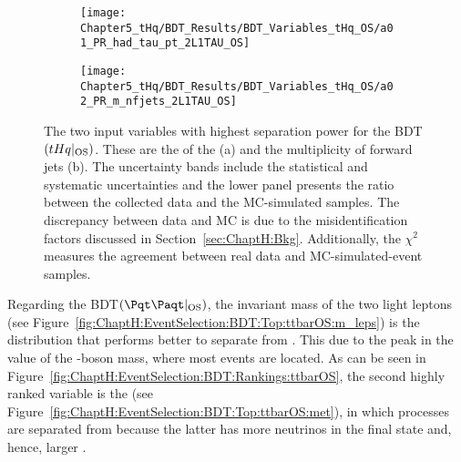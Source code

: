 \begin{figure}[h]
\centering
\begin{subfigure}{.475\textwidth}
  \centering
  \texttt{[image: Chapter5\_tHq/BDT\_Results/BDT\_Variables\_tHq\_OS/a01\_PR\_had\_tau\_pt\_2L1TAU\_OS]}
  \caption{}
  \label{fig:ChaptH:EventSelection:BDT:Top:tHqOS:pt}
\end{subfigure}%
\begin{subfigure}{.475\textwidth}
  \centering
  \texttt{[image: Chapter5\_tHq/BDT\_Results/BDT\_Variables\_tHq\_OS/a02\_PR\_m\_nfjets\_2L1TAU\_OS]}
  \caption{}
  \label{fig:ChaptH:EventSelection:BDT:Top:tHqOS:n_fjets}
\end{subfigure}
\caption{The two input variables with highest separation power for the BDT$(tHq|_{\text{OS}})$. 
These are the \pT of the \tauhad (a) and the multiplicity of forward jets (b).
The uncertainty bands include 
the statistical and systematic uncertainties and the lower panel presents the ratio between the collected data and the MC-simulated samples.
The discrepancy between data and MC is due to the misidentification factors discussed in Section~\ref{sec:ChaptH:Bkg}.
Additionally, the $\chi^2$ measures the agreement between real data and MC-simulated-event samples.}
\label{fig:ChaptH:EventSelection:BDT:Top:tHqOS}
\end{figure}



Regarding the BDT$(\ttbar|_{\text{OS}})$, the invariant mass of the two light leptons (see 
Figure~\ref{fig:ChaptH:EventSelection:BDT:Top:ttbarOS:m_leps}) is the distribution that 
performs better to separate \ttbar from \Zjets. This due to the peak in the value of the
\PZ-boson mass, where most \Zjets events are located. As can be seen in Figure~\ref{fig:ChaptH:EventSelection:BDT:Rankings:ttbarOS},
the second highly ranked variable is the \MET (see Figure~\ref{fig:ChaptH:EventSelection:BDT:Top:ttbarOS:met}), in which \Zjets processes are separated
from \ttbar because the latter has more neutrinos in the final state and, hence, larger \MET.



